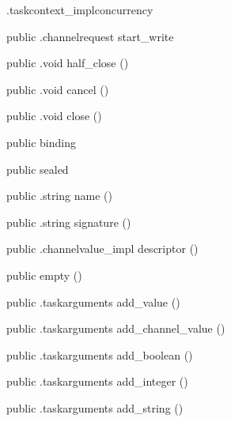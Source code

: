 \begin{CrexxClass}{.taskcontext\_impl}{concurrency}
\begin{Members}
    \Method
      {public}
      {.channelrequest}
      {start\_write}
      {}

    \Method
      {public}
      {.void}
      {half\_close}
      {()}

    \Method
      {public}
      {.void}
      {cancel}
      {()}

    \Method
      {public}
      {.void}
      {close}
      {()}

    \Factory
      {public}
      {binding}
      {}

    \Factory
      {public}
      {sealed}
      {}

    \Method
      {public}
      {.string}
      {name}
      {()}

    \Method
      {public}
      {.string}
      {signature}
      {()}

    \Method
      {public}
      {.channelvalue\_impl}
      {descriptor}
      {()}

    \Factory
      {public}
      {empty}
      {()}

    \Method
      {public}
      {.taskarguments}
      {add\_value}
      {()}

    \Method
      {public}
      {.taskarguments}
      {add\_channel\_value}
      {()}

    \Method
      {public}
      {.taskarguments}
      {add\_boolean}
      {()}

    \Method
      {public}
      {.taskarguments}
      {add\_integer}
      {()}

    \Method
      {public}
      {.taskarguments}
      {add\_string}
      {()}


\end{Members}
\end{CrexxClass}
